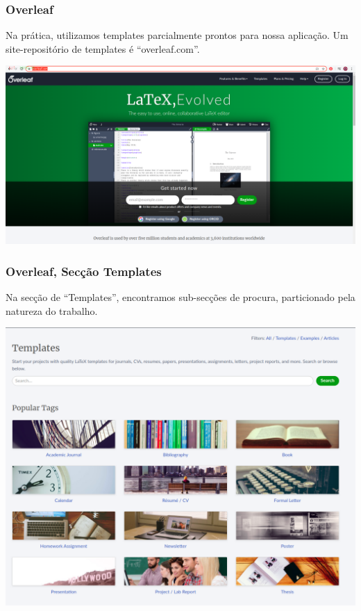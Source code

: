 \documentclass{beamer}
\begin{document}
\begin{frame}

  \frametitle{Overleaf}
  Na prática, utilizamos templates parcialmente prontos para nossa
  aplicação. Um site-repositório de templates é ``overleaf.com''.

  \begin{center}
  \includegraphics[scale=0.17]{../Imagens/OVERL1.png}
  \end{center}


\end{frame}




\begin{frame}
  \frametitle{Overleaf, Secção Templates}
  Na secção de ``Templates'', encontramos sub-secções de procura,
  particionado pela natureza do trabalho.
  \begin{center}
    \includegraphics[scale=0.20]{../Imagens/OVERL2.png}
  \end{center}

\end{frame}
\end{document}
